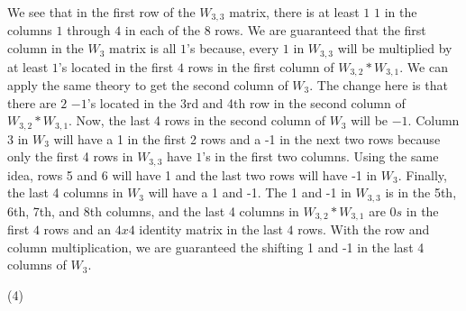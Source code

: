 \documentclass[12pt]{article}
\begin{document}
We see that in the first row of the $W_{3,3}$ matrix, there is at least $1$ $1$ in the columns $1$ through $4$ in each of the $8$ rows. We are guaranteed that the first column in the $W_3$ matrix is all $1$'s because, every $1$ in $W_{3,3}$ will be multiplied by at least $1$'s located in the first $4$ rows in the first column of  $W_{3,2}*W_{3,1}$. We can apply the same theory to get the second column of $W_3$. The change here is that there are $2$ $-1$'s located in the 3rd and 4th row in the second column of $W_{3,2}*W_{3,1}$. Now, the last 4 rows in the second column of $W_3$ will be $-1$. Column 3 in $W_3$ will have a  1 in the first 2 rows and a -1 in the next two rows because only the first 4 rows in $W_{3,3}$ have $1$'s in the first two columns. Using the same idea, rows 5 and 6 will have 1 and the last two rows will have -1 in $W_3$. Finally, the last 4 columns in $W_3$ will have a 1 and -1. The 1 and -1 in $W_{3,3}$ is in the 5th, 6th, 7th, and 8th columns, and the last 4 columns in $W_{3,2}*W_{3,1}$ are $0s$ in the first $4$ rows and an $4x4$ identity matrix in the last $4$ rows. With the row and column multiplication, we are guaranteed the shifting 1 and -1 in the last 4 columns of $W_3$. 

\medskip
(4) 
\end{document}
